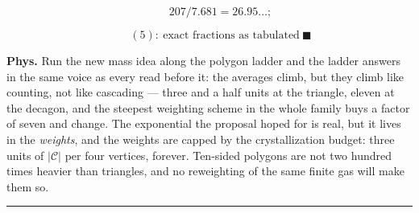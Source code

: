 \begin{theorem}
\[
\qquad 207/7.681=26.95\ldots;
\]

\[
\qquad (5):\ \text{exact fractions as tabulated}\ \blacksquare
\]

\textbf{Phys.} Run the new mass idea along the polygon ladder and the ladder answers in the same voice as every read before it: the averages climb, but they climb like counting, not like cascading — three and a half units at the triangle, eleven at the decagon, and the steepest weighting scheme in the whole family buys a factor of seven and change. The exponential the proposal hoped for is real, but it lives in the \textit{weights}, and the weights are capped by the crystallization budget: three units of $|\mathcal C|$ per four vertices, forever. Ten-sided polygons are not two hundred times heavier than triangles, and no reweighting of the same finite gas will make them so.

\vspace{2pt}\noindent\rule{\textwidth}{0.4pt}\vspace{2pt}

\end{theorem}

